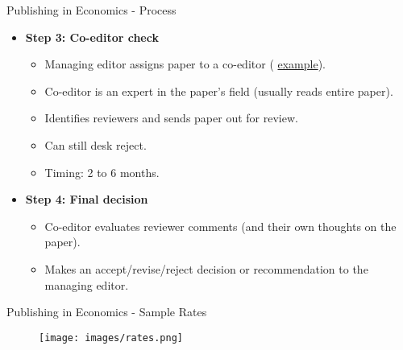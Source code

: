 \documentclass{beamer}
\begin{document}
\begin{frame}{Publishing in Economics - Process}
\begin{itemize}
    \item \textbf{Step 3: Co-editor check}
    \begin{itemize}
        \item Managing editor assigns paper to a co-editor (\color{blue} \href{https://www.aeaweb.org/journals/aer/about-aer/editors}{example}\color{black}).
        \item Co-editor is an expert in the paper's field (usually reads entire paper).
        \item Identifies reviewers and sends paper out for review.
        \item Can still desk reject.
        \item Timing: 2 to 6 months.
    \end{itemize}
\medskip
    \pause \item \textbf{Step 4: Final decision}
    \begin{itemize}
        \item Co-editor evaluates reviewer comments (and their own thoughts on the paper). 
        \item Makes an accept/revise/reject decision or recommendation to the managing editor.
    \end{itemize}
\end{itemize}
\end{frame}

\begin{frame}{Publishing in Economics - Sample Rates}
    \begin{figure}
        \texttt{[image: images/rates.png]}
    \end{figure}      
\end{frame}
\end{document}
